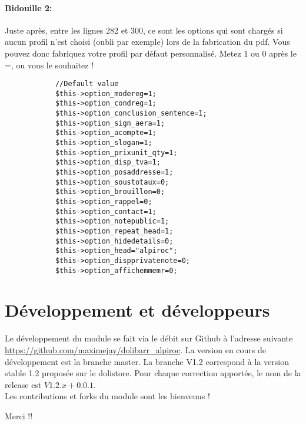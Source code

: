\documentclass[a4paper,11pt]{article}
\begin{document}
\paragraph{Bidouille 2:\\}

Juste après, entre les lignes 282 et 300, ce sont les options qui sont chargés si aucun profil n'est choisi (oubli par exemple) lors de la fabrication du pdf. Vous pouvez donc fabriquez votre profil par défaut personnalisé. Metez 1 ou 0 après le =, ou vous le souhaitez !

\begin{verbatim}
  			//Default value
			$this->option_modereg=1;
			$this->option_condreg=1;
			$this->option_conclusion_sentence=1;
			$this->option_sign_aera=1;
			$this->option_acompte=1;
			$this->option_slogan=1;
			$this->option_prixunit_qty=1;
			$this->option_disp_tva=1;
			$this->option_posaddresse=1;
			$this->option_soustotaux=0;
			$this->option_brouillon=0;
			$this->option_rappel=0;
			$this->option_contact=1;
			$this->option_notepublic=1;
			$this->option_repeat_head=1;
			$this->option_hidedetails=0;
			$this->option_head="alpiroc";
			$this->option_dispprivatenote=0;
			$this->option_affichemmemr=0;
\end{verbatim}


\section{Développement et développeurs}
Le développement du module se fait via le débit sur Github à l'adresse suivante \url{https://github.com/maximejay/dolibarr\_alpiroc}.
La version en cours de développement est la branche master. La branche V1.2 correspond à la version stable 1.2 proposée sur le dolistore. Pour chaque correction apportée, le nom de la release est $V1.2.x + 0.0.1$. \\
Les contributions et forks du module sont les bienvenus ! 

Merci !!



\end{document}
